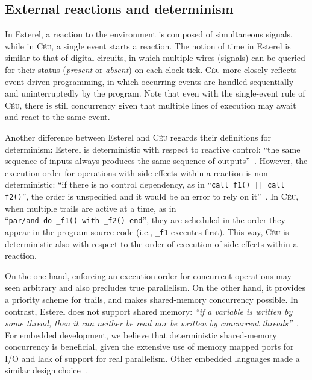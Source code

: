 \documentclass{sigplanconf}
\newcommand{\CEU}{\textsc{C\'{e}u}\xspace}
\newcommand{\code}[1] {{\small{\texttt{#1}}}}
\newcommand{\1}{\;}
\newcommand{\2}{\;\;}
\newcommand{\3}{\;\;\;}
\newcommand{\5}{\;\;\;\;\;}
\begin{document}
\subsection{External reactions and determinism}
\label{sec.ceu.det}

In Esterel, a reaction to the environment is composed of simultaneous signals, 
while in \CEU, a single event starts a reaction.
%
The notion of time in Esterel is similar to that of digital circuits, in which 
multiple wires (signals) can be queried for their status (\emph{present} or 
\emph{absent}) on each clock tick.
%
\CEU more closely reflects event-driven programming, in which occurring events 
are handled sequentially and uninterruptedly by the program.
%
Note that even with the single-event rule of \CEU, there is still concurrency 
given that multiple lines of execution may await and react to the same event.

Another difference between Esterel and \CEU regards their definitions for 
determinism:
%
Esterel is deterministic with respect to reactive control: ``the same sequence 
of inputs always produces the same sequence of outputs''~\cite{esterel.primer}.
However, the execution order for operations with side-effects within a reaction 
is non-deterministic: ``if there is no control dependency, as in ``\code{call 
f1() || call f2()}'', the order is unspecified and it would be an error to rely 
on it''~\cite{esterel.primer}.
%
In \CEU, when multiple trails are active at a time, as in
``\code{par/and~do~\_f1()~with~\_f2()~end}'', they are scheduled in the order 
they appear in the program source code (i.e., \code{\_f1} executes first).
%
This way, \CEU is deterministic also with respect to the order of execution of 
side effects within a reaction.

On the one hand, enforcing an execution order for concurrent operations may 
seen arbitrary and also precludes true parallelism.
On the other hand, it provides a priority scheme for trails, and makes 
shared-memory concurrency possible.
In contrast, Esterel does not support shared memory: \emph{``if a variable is 
written by some thread, then it can neither be read nor be written by 
concurrent threads''}~\cite{esterel.primer}.
%
For embedded development, we believe that deterministic shared-memory 
concurrency is beneficial, given the extensive use of memory mapped ports for 
I/O and lack of support for real parallelism.
Other embedded languages made a similar design choice~\cite{wsn.sol,pret}.
\end{document}
